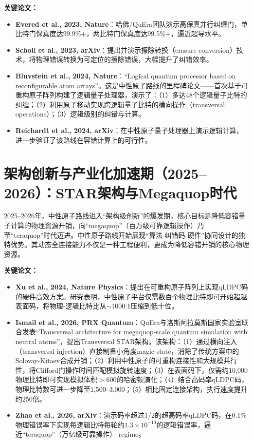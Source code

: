 \documentclass[11pt,a4paper]{ctexart}
\begin{document}
\textbf{关键论文：}
\begin{itemize}
\item \textbf{Evered et al., 2023, Nature}：哈佛/QuEra团队演示高保真并行纠缠门，单比特门保真度达99.9\%+，两比特门保真度达99.5\%+，逼近超导水平。
\item \textbf{Scholl et al., 2023, arXiv}：提出并演示擦除转换（erasure conversion）技术，将物理错误转换为可定位的擦除错误，大幅提升了纠错效率。
\item \textbf{Bluvstein et al., 2024, Nature}：``Logical quantum processor based on reconfigurable atom arrays''。这是中性原子路线的里程碑论文——首次基于可重构原子阵列构建了逻辑量子处理器，演示了：（1）多达48个逻辑量子比特的纠缠；（2）利用原子移动实现跨逻辑量子比特的横向操作（transversal operations）；（3）逻辑级别的纠错与计算。
\item \textbf{Reichardt et al., 2024, arXiv}：在中性原子量子处理器上演示逻辑计算，进一步验证了该路线在容错计算上的可行性。
\end{itemize}

\section{架构创新与产业化加速期（2025--2026）：STAR架构与Megaquop时代}

2025--2026年，中性原子路线进入``架构级创新''的爆发期，核心目标是降低容错量子计算的物理资源开销，向``megaquop''（百万级可靠逻辑操作）乃至``teraquop''时代迈进。中性原子路线开始展现``算法-纠错码-硬件''协同设计的独特优势。其动态全连接能力不仅是一种工程便利，更成为降低容错开销的核心物理资源。

\textbf{关键论文：}
\begin{itemize}
\item \textbf{Xu et al., 2024, Nature Physics}：提出在可重构原子阵列上实现qLDPC码的硬件高效方案。研究表明，中性原子平台仅需数百个物理比特即可开始超越表面码，将物理-逻辑比特比从$\sim$1000:1压缩到低十位。
\item \textbf{Ismail et al., 2026, PRX Quantum}：QuEra与洛斯阿拉莫斯国家实验室联合发表``Transversal architecture for megaquop-scale quantum simulation with neutral atoms''，提出Transversal STAR架构。该架构：（1）通过横向注入（transversal injection）直接制备小角度magic state，消除了传统方案中的Solovay-Kitaev合成开销；（2）利用中性原子的可重构连接性和大规模并行性，将Clifford门操作时间匹配模拟旋转速度；（3）在表面码下，仅需约10,000物理比特即可实现模拟体积$>600$的哈密顿演化；（4）结合高码率qLDPC码，物理比特数可进一步降至1,500--3,000；（5）相比固定连接架构，执行速度提升约250倍。
\item \textbf{Zhao et al., 2026, arXiv}：演示码率超过1/2的超高码率qLDPC码，在0.1\%物理错误率下实现每逻辑比特每轮约$1.3\times10^{-13}$的逻辑错误率，逼近``teraquop''（万亿级可靠操作） regime。
\end{itemize}
\end{document}
